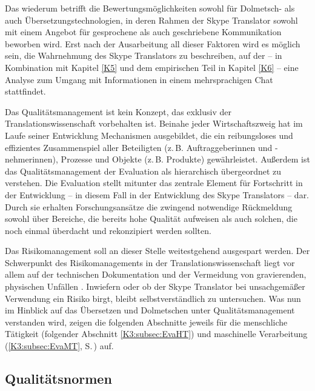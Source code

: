 Das wiederum betrifft die Bewertungsmöglichkeiten sowohl für Dolmetsch- als auch Übersetzungstechnologien, in deren Rahmen der Skype Translator sowohl mit einem Angebot für gesprochene als auch geschriebene Kommunikation beworben wird. Erst nach der Ausarbeitung all dieser Faktoren wird es möglich sein, die Wahrnehmung des Skype Translators zu beschreiben, auf der -- in Kombination mit Kapitel \ref{K5} und dem empirischen Teil in Kapitel \ref{K6} -- eine Analyse zum Umgang mit Informationen in einem mehrsprachigen Chat stattfindet.

Das Qualitätsmanagement ist kein Konzept, das exklusiv der Translationswissenschaft vorbehalten ist. Beinahe jeder Wirtschaftszweig hat im Laufe seiner Entwicklung Mechanismen ausgebildet, die ein reibungsloses und effizientes Zusammenspiel aller Beteiligten (z.\,B. Auftraggeber{\textperiodcentered}innen und -nehmer{\textperiodcentered}innen), Prozesse und Objekte (z.\,B. Produkte) gewährleistet. Außerdem ist das Qualitätsmanagement der Evaluation als hierarchisch übergeordnet zu verstehen. Die Evaluation stellt mitunter das zentrale Element für Fortschritt in der Entwicklung -- in diesem Fall in der Entwicklung des Skype Translators -- dar. Durch sie erhalten Forschungsansätze die zwingend notwendige Rückmeldung sowohl über Bereiche, die bereits hohe Qualität aufweisen als auch solchen, die noch einmal überdacht und rekonzipiert werden sollten. 

Das Risikomanagement soll an dieser Stelle weitestgehend ausgespart werden. Der Schwerpunkt des Risikomanagements in der Translationswissenschaft liegt vor allem auf der technischen Dokumentation und der Vermeidung von gravierenden, physischen Unfällen \citep[vgl.\,z.\,B.][]{canfora_risikomanagement_2015, altena_expertenwissen_2014}. Inwiefern oder ob der Skype Translator bei unsachgemäßer Verwendung ein Risiko birgt, bleibt selbstverständlich zu untersuchen. Was nun im Hinblick auf das Übersetzen und Dolmetschen unter Qualitätsmanagement verstanden wird, zeigen die folgenden Abschnitte jeweils für die menschliche Tätigkeit (folgender Abschnitt \ref{K3:subsec:EvaHT}) und maschinelle Verarbeitung (\ref{K3:subsec:EvaMT}, S.\,\pageref{K3:subsec:EvaHT}) auf.




\subsection{Qualitätsnormen}
\label{K3:subsubsecQualität}

